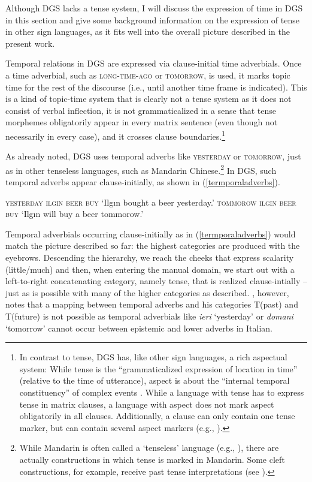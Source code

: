 \noindent Although DGS lacks a tense system, I will discuss the expression of time in DGS in this section and give some background information on the expression of tense in other sign languages, as it fits well into the overall picture described in the present work.

Temporal relations in DGS are expressed via clause-initial time adverbials. Once a time adverbial, such as \textsc{long-time-ago} or \textsc{tomorrow}, is used, it marks topic time for the rest of the discourse (i.e., until another time frame is indicated). This is a kind of topic-time system that is clearly not a tense system as it does not consist of verbal inflection, it is not grammaticalized in a sense that tense morphemes obligatorily appear in every matrix sentence (even though not necessarily in every case), and it crosses clause boundaries.\footnote{ In contrast to tense, DGS has, like other sign languages, a rich aspectual system: While tense is the ``grammaticalized expression of location in time'' (relative to the time of utterance), aspect is about the ``internal temporal constituency'' of complex events \citep[9--10]{comrie1985tense}. While a language with tense has to express tense in matrix clauses, a language with aspect does not mark aspect obligatorily in all clauses. Additionally, a clause can only contain one tense marker, but can contain several aspect markers (e.g., \citealt[18--19]{judith2006temporal}). }

As already noted, DGS uses temporal adverbs like \textsc{yesterday} or \textsc{tomorrow}, just as in other tenseless languages, such as Mandarin Chinese.\footnote{ While Mandarin is often called a `tenseless' language (e.g., \citealt{lin2006time, lin2012tenselessness}), there are actually constructions in which tense is marked in Mandarin. Some cleft constructions, for example, receive past tense interpretations (see \citealt{hole2011deconstruction}).} In DGS, such temporal adverbs appear clause-initially, as shown in (\ref{termporaladverbs}).

\begin{exe} 
\ex\label{termporaladverbs}\begin{xlist}
\ex\textsc{yesterday ilg\i n beer buy} \label{yesterdaypaula} 
\glt `Ilg\i n bought a beer yesterday.'
\ex\textsc{tommorow ilg\i n beer buy} \label{yesterdaypaulb} 
\glt `Ilg\i n will buy a beer tommorow.'
\end{xlist}
\end{exe}  

\noindent Temporal adverbials occurring clause-initially as in (\ref{termporaladverbs}) would match the picture described so far: the highest categories are produced with the eyebrows. Descending the hierarchy, we reach the cheeks that express scalarity (little/much) and then, when entering the manual domain, we start out with a left-to-right concatenating category, namely tense, that is realized clause-intially -- just as is possible with many of the higher categories as described. \citet[87]{cinque1999adverbs}, however, notes that a mapping between temporal adverbs and his categories T(past) and T(future) is not possible as temporal adverbials like \textit{ieri} `yesterday' or \textit{domani} `tomorrow' cannot occur between epistemic and lower adverbs in Italian.

